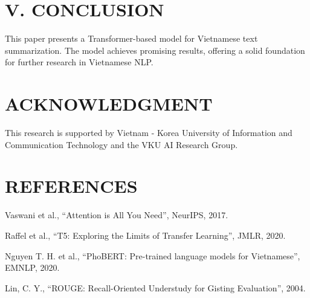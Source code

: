 \documentclass{article}
\begin{document}
\section*{V. CONCLUSION}
This paper presents a Transformer-based model for Vietnamese text summarization. The model achieves promising results, offering a solid foundation for further research in Vietnamese NLP.

\vspace{1em}
\section*{ACKNOWLEDGMENT}
This research is supported by Vietnam - Korea University of Information and Communication Technology and the VKU AI Research Group.

\vspace{1em}
\section*{REFERENCES}
\begin{enumerate}[label={[{\arabic*}]}]
\item Vaswani et al., ``Attention is All You Need'', NeurIPS, 2017.
\item Raffel et al., ``T5: Exploring the Limits of Transfer Learning'', JMLR, 2020.
\item Nguyen T. H. et al., ``PhoBERT: Pre-trained language models for Vietnamese'', EMNLP, 2020.
\item Lin, C. Y., ``ROUGE: Recall-Oriented Understudy for Gisting Evaluation'', 2004.
\end{enumerate}
\end{document}
